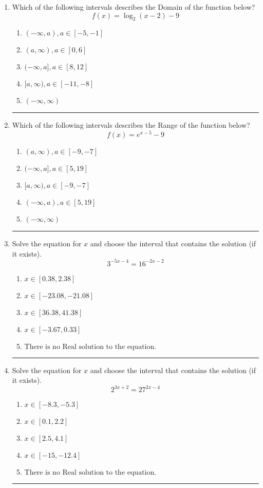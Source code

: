 \documentclass[14pt]{extbook}
\newcommand{\litem}[1]{\item#1\hspace*{-1cm}\rule{\textwidth}{0.4pt}}
\begin{document}
\begin{enumerate}
{\begin{enumerate}[label=\Alph*.]
\end{enumerate} }
\litem{
Which of the following intervals describes the Domain of the function below?\[ f(x) = \log_2{(x-2)}-9 \]\begin{enumerate}[label=\Alph*.]
\item \( (-\infty, a), a \in [-5, -1] \)
\item \( (a, \infty), a \in [0, 6] \)
\item \( (-\infty, a], a \in [8, 12] \)
\item \( [a, \infty), a \in [-11, -8] \)
\item \( (-\infty, \infty) \)

\end{enumerate} }
\litem{
Which of the following intervals describes the Range of the function below?\[ f(x) = e^{x-5}-9 \]\begin{enumerate}[label=\Alph*.]
\item \( (a, \infty), a \in [-9, -7] \)
\item \( (-\infty, a], a \in [5, 19] \)
\item \( [a, \infty), a \in [-9, -7] \)
\item \( (-\infty, a), a \in [5, 19] \)
\item \( (-\infty, \infty) \)

\end{enumerate} }
\litem{
Solve the equation for $x$ and choose the interval that contains the solution (if it exists).\[ 3^{-5x-4} = 16^{-2x-2} \]\begin{enumerate}[label=\Alph*.]
\item \( x \in [0.38, 2.38] \)
\item \( x \in [-23.08, -21.08] \)
\item \( x \in [36.38, 41.38] \)
\item \( x \in [-3.67, 0.33] \)
\item \( \text{There is no Real solution to the equation.} \)

\end{enumerate} }
\litem{
Solve the equation for $x$ and choose the interval that contains the solution (if it exists).\[ 2^{3x+2} = 27^{2x-4} \]\begin{enumerate}[label=\Alph*.]
\item \( x \in [-8.3, -5.3] \)
\item \( x \in [0.1, 2.2] \)
\item \( x \in [2.5, 4.1] \)
\item \( x \in [-15, -12.4] \)
\item \( \text{There is no Real solution to the equation.} \)


\end{enumerate}}
\end{enumerate}
\end{document}
